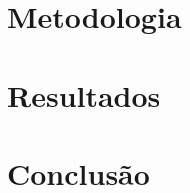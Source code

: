 \documentclass{abnt}
\begin{document}
\clearpage
\chapter{Metodologia}



\clearpage
\chapter{Resultados}



\clearpage
\chapter{Conclusão}



\clearpage
\nocite{*}
		
		
\end{document}
